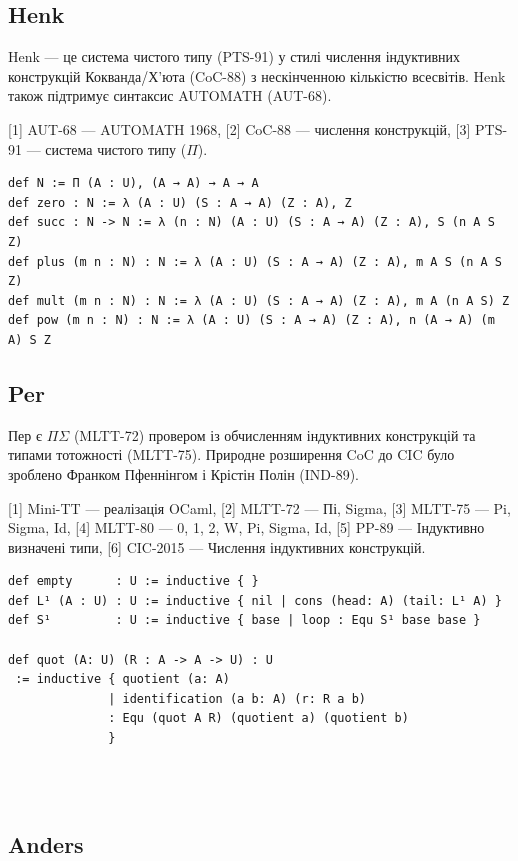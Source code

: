 \subsection*{Henk}

Henk — це система чистого типу (PTS-91) у стилі числення індуктивних
конструкцій Кокванда/Х’юта (CoC-88) з нескінченною кількістю всесвітів.
Henk також підтримує синтаксис AUTOMATH (AUT-68).

[1] AUT-68 — AUTOMATH 1968, [2] CoC-88 — числення конструкцій, [3] PTS-91 — система чистого типу ($\Pi$).

\begin{lstlisting}
def N := Π (A : U), (A → A) → A → A
def zero : N := λ (A : U) (S : A → A) (Z : A), Z
def succ : N -> N := λ (n : N) (A : U) (S : A → A) (Z : A), S (n A S Z)
def plus (m n : N) : N := λ (A : U) (S : A → A) (Z : A), m A S (n A S Z)
def mult (m n : N) : N := λ (A : U) (S : A → A) (Z : A), m A (n A S) Z
def pow (m n : N) : N := λ (A : U) (S : A → A) (Z : A), n (A → A) (m A) S Z
\end{lstlisting}

\subsection*{Per}

Пер є $\Pi\Sigma$ (MLTT-72) провером із обчисленням індуктивних конструкцій
та типами тотожності (MLTT-75). Природне розширення CoC до CIC було
зроблено Франком Пфеннінгом і Крістін Полін (IND-89).

[1] Mini-TT — реалізація OCaml,
[2] MLTT-72 — Пі, Sigma,
[3] MLTT-75 — Pi, Sigma, Id,
[4] MLTT-80 — 0, 1, 2, W, Pi, Sigma, Id,
[5] PP-89 — Індуктивно визначені типи,
[6] CIC-2015 — Числення індуктивних конструкцій.

\begin{lstlisting}
def empty      : U := inductive { }
def L¹ (A : U) : U := inductive { nil | cons (head: A) (tail: L¹ A) }
def S¹         : U := inductive { base | loop : Equ S¹ base base }

def quot (A: U) (R : A -> A -> U) : U
 := inductive { quotient (a: A)
              | identification (a b: A) (r: R a b)
              : Equ (quot A R) (quotient a) (quotient b)
              }
\end{lstlisting}
\\
\\
\newpage
\subsection*{Anders}

